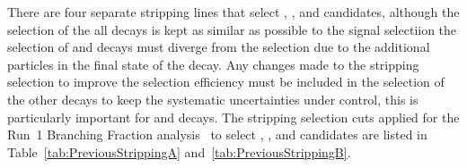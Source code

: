 There are four separate stripping lines that select \bmumu, \bujpsik, \bsjpsiphi and \bhh candidates, although the selection of the all decays is kept as similar as possible to the signal selectiion the selection of \bujpsik and \bsjpsiphi decays must diverge from the \bmumu selection due to the additional particles in the final state of the decay. Any changes made to the \bmumu stripping selection to improve the selection efficiency must be included in the selection of the other decays to keep the systematic uncertainties under control, this is particularly important for \bhh and \bujpsik decays. %
The stripping selection cuts applied for the Run~1 Branching Fraction analysis~\cite{CMS:2014xfa, Aaij:2013aka} to select \bmumu, \bujpsik, \bsjpsiphi and \bhh candidates are listed in Table~\ref{tab:PreviousStrippingA} and~\ref{tab:PreviousStrippingB}.

